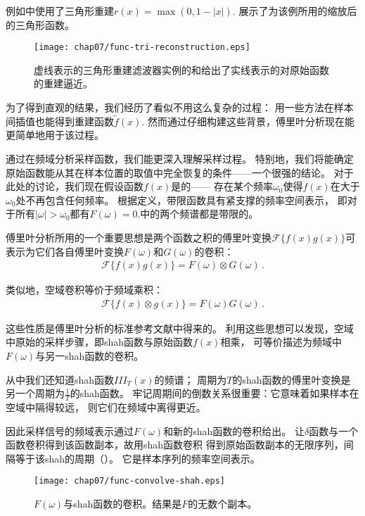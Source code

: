 例如中使用了三角形重建$r(x)=\max(0,1-|x|)$.
展示了为该例所用的缩放后的三角形函数。
\begin{figure}[htbp]
    \centering\texttt{[image: chap07/func-tri-reconstruction.eps]}
    \caption{虚线表示的三角形重建滤波器实例的和给出了实线表示的对原始函数的重建逼近。}
    \label{fig:7.5}
\end{figure}

为了得到直观的结果，我们经历了看似不用这么复杂的过程：
用一些方法在样本间插值也能得到重建函数$\tilde{f}(x)$.
然而通过仔细构建这些背景，傅里叶分析现在能更简单地用于该过程。

通过在频域分析采样函数，我们能更深入理解采样过程。
特别地，我们将能确定原始函数能从其在样本位置的取值中完全恢复的条件——一个很强的结论。
对于此处的讨论，我们现在假设函数$f(x)$是的——
存在某个频率$\omega_0$使得$f(x)$在大于$\omega_0$处不再包含任何频率。
根据定义，带限函数具有紧支撑的频率空间表示，
即对于所有$|\omega|>\omega_0$都有$F(\omega)=0$.中的两个频谱都是带限的。

傅里叶分析所用的一个重要思想是两个函数之积的傅里叶变换$\mathcal{F}\{f(x)g(x)\}$可
表示为它们各自傅里叶变换$F(\omega)$和$G(\omega)$的卷积：
\begin{align*}
    \mathcal{F}\{f(x)g(x)\}=F(\omega)\otimes G(\omega)\, .
\end{align*}

类似地，空域卷积等价于频域乘积：
\begin{align}\label{eq:7.3}
    \mathcal{F}\{f(x)\otimes g(x)\}=F(\omega)G(\omega)\, .
\end{align}

这些性质是傅里叶分析的标准参考文献中得来的。
利用这些思想可以发现，空域中原始的采样步骤，即shah函数与原始函数$f(x)$相乘，
可等价描述为频域中$F(\omega)$与另一shah函数的卷积。

从中我们还知道shah函数$III_T(x)$的频谱；
周期为$T$的shah函数的傅里叶变换是另一个周期为$\displaystyle\frac{1}{T}$的shah函数。
牢记周期间的倒数关系很重要：它意味着如果样本在空域中隔得较远，
则它们在频域中离得更近。

因此采样信号的频域表示通过$F(\omega)$和新的shah函数的卷积给出。
让$\delta$函数与一个函数卷积得到该函数副本，故用shah函数卷积
得到原始函数副本的无限序列，间隔等于该shah的周期（）。
它是样本序列的频率空间表示。
\begin{figure}[htbp]
    \centering\texttt{[image: chap07/func-convolve-shah.eps]}
    \caption{$F(\omega)$与shah函数的卷积。结果是$F$的无数个副本。}
    \label{fig:7.6}
\end{figure}

